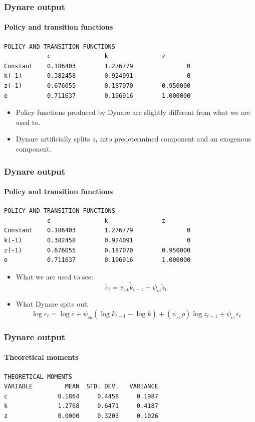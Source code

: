 \documentclass{beamer}
\begin{document}
\begin{frame}[fragile]
\frametitle{Dynare output}
\framesubtitle{Policy and transition functions}

\begin{verbatim}
POLICY AND TRANSITION FUNCTIONS
            c               k               z
Constant    0.186403        1.276779               0
k(-1)       0.382458        0.924091               0
z(-1)       0.676055        0.187070        0.950000
e           0.711637        0.196916        1.000000
\end{verbatim}


\begin{itemize}
	\item Policy functions produced by Dynare are slightly different from what we are used to.
	\item Dynare artificially splits $ z_{t} $ into predetermined component and an exogenous component.
	
\end{itemize}
\end{frame}
\begin{frame}[fragile]
\frametitle{Dynare output}
\framesubtitle{Policy and transition functions}

\begin{verbatim}
POLICY AND TRANSITION FUNCTIONS
            c               k               z
Constant    0.186403        1.276779               0
k(-1)       0.382458        0.924091               0
z(-1)       0.676055        0.187070        0.950000
e           0.711637        0.196916        1.000000
\end{verbatim}


\begin{itemize}
	\item What we are used to see:
	$$ \tilde{c}_{t} =\psi_{c k} \tilde{k}_{t-1}+\psi_{c z} \tilde{z}_{t} $$
	\item What Dynare spits out:
	$$ \log c_{t} =\log \overline{c}+\psi_{c k} (\log k_{t-1}-\log \overline{k})+\left(\psi_{c z} \rho\right) \log z_{t-1}+\psi_{c z} \varepsilon_{t}$$
\end{itemize}
\end{frame}

\begin{frame}[fragile]
\frametitle{Dynare output}
\framesubtitle{Theoretical moments}

\begin{verbatim}
THEORETICAL MOMENTS
VARIABLE         MEAN  STD. DEV.   VARIANCE
c              0.1864     0.4458     0.1987
k              1.2768     0.6471     0.4187
z              0.0000     0.3203     0.1026

\end{verbatim}

\end{frame}
\end{document}
